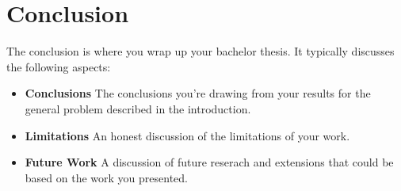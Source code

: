 \section{Conclusion} \label{sec:conclusion}

The conclusion is where you wrap up your bachelor thesis. It typically discusses the following aspects:
\begin{itemize}
  \item \textbf{Conclusions} The conclusions you're drawing from your results for the general problem described in the introduction.
  \item \textbf{Limitations} An honest discussion of the limitations of your work.
  \item \textbf{Future Work} A discussion of future reserach and extensions that could be based on the work you presented.
\end{itemize}
